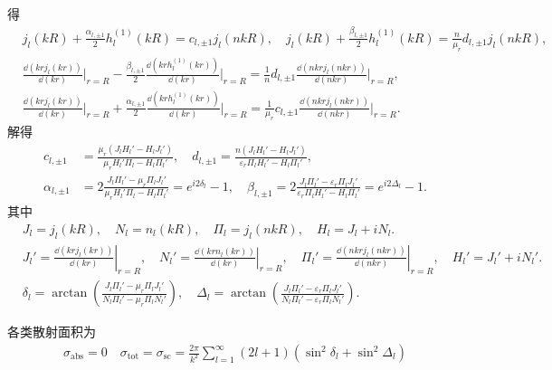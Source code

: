 \begin{exbox}
	得
	\begin{align*}
		 & j_l(kR)+\frac{\alpha_{l,\pm1}}{2}h_l^{(1)}(kR) = c_{l,\pm1}j_l(nkR), \quad j_l(kR)+\frac{\beta_{l,\pm1}}{2}h_l^{(1)}(kR) = \frac{n}{\mu_r}d_{l,\pm1}j_l(nkR),                            \\
		 & \frac{\dd(krj_l(kr))}{\dd(kr)}\bigg|_{r=R}-\frac{\beta_{l,\pm1}}{2}\frac{\dd(krh_l^{(1)}(kr))}{\dd(kr)}\bigg|_{r=R} = \frac{1}{n}d_{l,\pm1}\frac{\dd(nkrj_l(nkr))}{\dd(nkr)}\bigg|_{r=R},      \\
		 & \frac{\dd(krj_l(kr))}{\dd(kr)}\bigg|_{r=R}+\frac{\alpha_{l,\pm1}}{2}\frac{\dd(krh_l^{(1)}(kr))}{\dd(kr)}\bigg|_{r=R} = \frac{1}{\mu_r}c_{l,\pm1}\frac{\dd(nkrj_l(nkr))}{\dd(nkr)}\bigg|_{r=R}.
	\end{align*}
	解得
	\begin{align*}
		c_{l,\pm1}      & = \frac{\mu_r\left(J_lH_l'-H_lJ_l'\right)}{\mu_rH_l'\Pi_l-H_l\Pi_l'}, \quad d_{l,\pm1} = \frac{n\left(J_lH_l'-H_lJ_l'\right)}{\varepsilon_r\Pi_lH_l'-H_l\Pi_l'},                                       \\
		\alpha_{l,\pm1} & = 2\frac{J_l\Pi_l'-\mu_r\Pi_lJ_l'}{\mu_rH_l'\Pi_l-H_l\Pi_l'}=e^{i2\delta_{l}}-1, \quad \beta_{l,\pm1} = 2\frac{J_l\Pi_l'-\varepsilon_r\Pi_lJ_l'}{\varepsilon_r\Pi_lH_l'-H_l\Pi_l'}=e^{i2\Delta_{l}}-1.
	\end{align*}
	其中
	\begin{align*}
		&J_l = j_l(kR),\quad N_l = n_l(kR),\quad \Pi_l = j_l(nkR),\quad H_l = J_l + iN_l.\\
		&J_l' = \left.\frac{\dd(krj_l(kr))}{\dd(kr)}\right|_{r=R},\quad
		N_l' = \left.\frac{\dd(krn_l(kr))}{\dd(kr)}\right|_{r=R},\quad
		\Pi_l' = \left.\frac{\dd(nkrj_l(nkr))}{\dd(nkr)}\right|_{r=R},\quad
		H_l' = J_l' + iN_l'.\\
		&\delta_{l} = \arctan\left(\frac{J_l\Pi_l' - \mu_r\Pi_lJ_l'}{N_l\Pi_l' - \mu_r\Pi_lN_l'}\right),\quad
		\Delta_{l} = \arctan\left(\frac{J_l\Pi_l' - \varepsilon_r\Pi_lJ_l'}{N_l\Pi_l' - \varepsilon_r\Pi_lN_l'}\right).
	\end{align*}

	各类散射面积为
	\begin{align*}
		\sigma_{\text{abs}}=0\quad \sigma_{\text{tot}}=\sigma_{\text{sc}}=\frac{2\pi}{k^2}\sum_{l=1}^{\infty}(2l+1)\left(\sin^2\delta_{l}+\sin^2\Delta_{l}\right)
	\end{align*}



\end{exbox}
